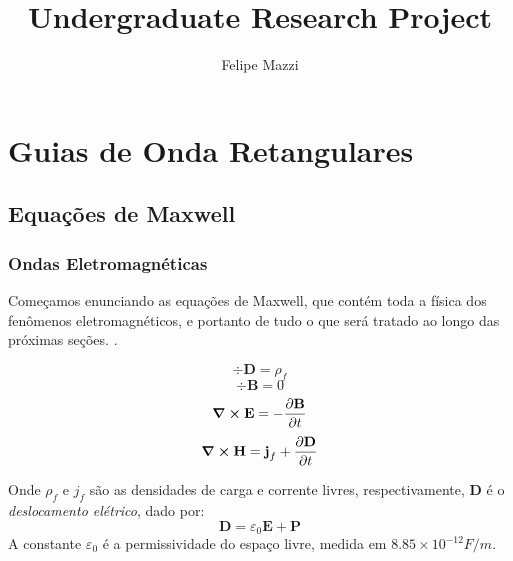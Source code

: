 \documentclass[12pt,a4paper]{report}
\title{\HUGE{\textbf{Notes: Quantum Optics}}\\[0.5cm]\large{Undergraduate Research Project}}
\author{\Large{Felipe Mazzi}}
\begin{document}
\maketitle

\tableofcontents


\chapter{Guias de Onda Retangulares}

\section{Equações de Maxwell}

\subsection{Ondas Eletromagnéticas}\label{Ondas.Eletromagnéticas}

Começamos enunciando as equações de Maxwell, que contém toda a física dos fenômenos eletromagnéticos, e portanto de tudo o que será tratado ao longo das próximas seções. \cite{Pollock2003IntegratedPhotonics}\cite{Fowles1975IntroductionOptics}.

\begin{equation}
    \div{\textbf{D}}=\rho_f
    \label{divD}
\end{equation}
\begin{equation}
    \div{\textbf{B}}=0
    \label{divB}
\end{equation}
\begin{equation}
    \curl{\textbf{E}}=-\frac{\partial\textbf{B}}{\partial t}
    \label{curlE}
\end{equation}
\begin{equation}
    \curl{\textbf{H}}=\textbf{j}_f+\frac{\partial\textbf{D}}{\partial t}
    \label{curlH}
\end{equation}

Onde $\rho_f$ e $j_f$ são as densidades de carga e corrente livres, respectivamente, $\textbf{D}$ é o \textit{deslocamento elétrico}, dado por:
\begin{equation}
    \textbf{D}=\varepsilon_0\textbf{E}+\textbf{P}
    \label{displacement}
\end{equation}
A constante $\varepsilon_0$ é a permissividade do espaço livre, medida em $8.85\times10^{-12} F/m$.
\end{document}
